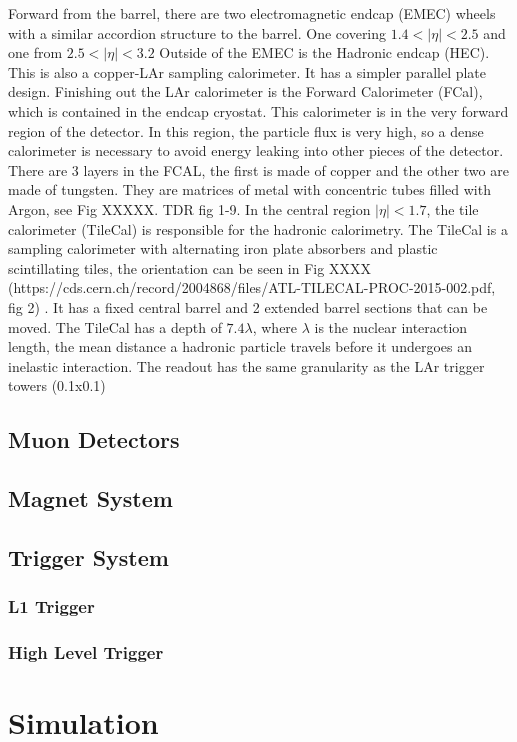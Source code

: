 \indent Forward from the barrel, there are two electromagnetic endcap (EMEC) wheels with a similar accordion structure to the barrel. One covering ${1.4 < |\eta{}| < 2.5}$ and one from ${2.5 < |\eta{}| < 3.2}$ Outside of the EMEC is the Hadronic endcap (HEC). This is also a copper-LAr sampling calorimeter. It has a simpler parallel plate design. Finishing out the LAr calorimeter is the Forward Calorimeter (FCal), which is contained in the endcap cryostat. This calorimeter is in the very forward region of the detector. In this region, the particle flux is very high, so a dense calorimeter is necessary to avoid energy leaking into other pieces of the detector. There are 3 layers in the FCAL, the first is made of copper and the other two are made of tungsten. They are matrices of metal with concentric tubes filled with Argon, see Fig XXXXX. TDR fig 1-9. \linebreak
\indent In the central region ${|\eta{}|<1.7}$, the tile calorimeter (TileCal) is responsible for the hadronic calorimetry. The TileCal is a sampling calorimeter with alternating iron plate absorbers and plastic scintillating tiles, the orientation can be seen in Fig XXXX (https://cds.cern.ch/record/2004868/files/ATL-TILECAL-PROC-2015-002.pdf, fig 2) . It has a fixed central barrel and 2 extended barrel sections that can be moved. The TileCal has a depth of ${7.4\lambda{}}$, where ${\lambda{}}$ is the nuclear interaction length, the mean distance a hadronic particle travels before it undergoes an inelastic interaction. The readout has the same granularity as the LAr trigger towers (0.1x0.1)
\subsection{Muon Detectors}
\subsection{Magnet System}\label{ssec:mag}
\subsection{Trigger System}
\subsubsection{L1 Trigger}
\subsubsection{High Level Trigger}
\section{Simulation}




